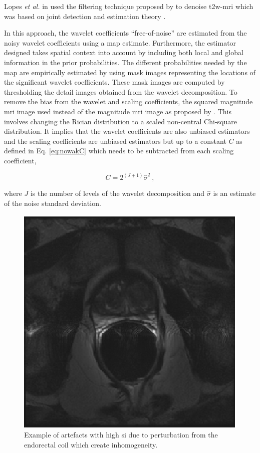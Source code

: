 \begin{enumerate}[leftmargin=*]
Lopes \textit{et al.} in \cite{Lopes2011} used the filtering technique proposed by \cite{Pizurica2003} to denoise \ac{t2w}-\ac{mri} which was based on joint detection and estimation theory \cite{Pizurica2003}.
{\color{blue}
In this approach, the wavelet coefficients ``free-of-noise'' are estimated from the noisy wavelet coefficients using a \ac{map} estimate.
Furthermore, the estimator designed takes spatial context into account by including both local and global information in the prior probabilities.
The different probabilities needed by the \ac{map} are empirically estimated by using mask images representing the locations of the significant wavelet coefficients.
These mask images are computed by thresholding the detail images obtained from the wavelet decomposition.
To remove the bias from the wavelet and scaling coefficients, the squared magnitude \ac{mri} image used instead of the magnitude \ac{mri} image as proposed by \cite{Nowak1999}.
This involves changing the Rician distribution to a scaled non-central Chi-square distribution.
It implies that the wavelet coefficients are also unbiased estimators and the scaling coefficients are unbiased estimators but up to a constant $C$ as defined in Eq. \eqref{eq:nowakC} which needs to be subtracted from each scaling coefficient,

\begin{equation}
	C=2^{(J+1)}\hat{\sigma}^2 \ ,
	\label{eq:nowakC}
\end{equation}

\noindent where $J$ is the number of levels of the wavelet decomposition and $\hat{\sigma}$ is an estimate of the noise standard deviation.
}
\begin{figure}
\centering
	\includegraphics[width=0.3\linewidth]{3_review/figures/processing/pre-processing/bias/t2w_bias_antenna.eps}
	\caption[Inhomogeneity artefacts due to perturbation of the endorectal coil.]{Example of artefacts with high \ac{si} due to perturbation from the endorectal coil which create inhomogeneity.}
	\label{fig:bias}
\end{figure}


\end{enumerate}
